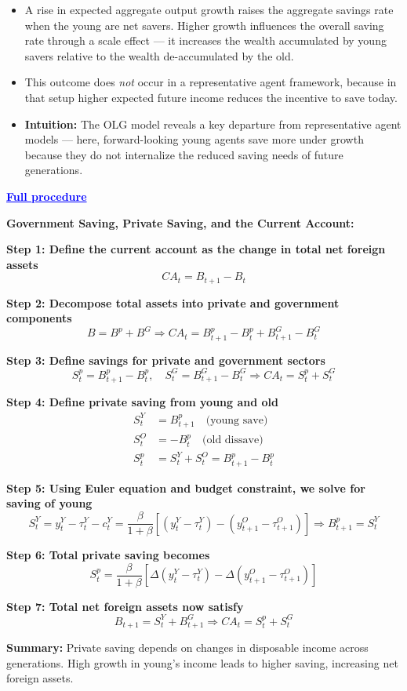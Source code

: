 \documentclass[12pt]{article}
\begin{document}
\begin{itemize}
  \item A rise in expected aggregate output growth raises the aggregate savings rate when the young are net savers. Higher growth influences the overall saving rate through a scale effect — it increases the wealth accumulated by young savers relative to the wealth de-accumulated by the old.

  \item This outcome does \textit{not} occur in a representative agent framework, because in that setup higher expected future income reduces the incentive to save today.
  
  \item \textbf{Intuition:} The OLG model reveals a key departure from representative agent models — here, forward-looking young agents save more under growth because they do not internalize the reduced saving needs of future generations.
\end{itemize}

\textcolor{blue}{\textbf{\uline{Full procedure}}}

{\color{blue}
\textbf{Government Saving, Private Saving, and the Current Account:}

\textbf{Step 1: Define the current account as the change in total net foreign assets}
\[
CA_t = B_{t+1} - B_t
\]

\textbf{Step 2: Decompose total assets into private and government components}
\[
B = B^p + B^G \Rightarrow CA_t = B^p_{t+1} - B^p_t + B^G_{t+1} - B^G_t
\]

\textbf{Step 3: Define savings for private and government sectors}
\[
S^p_t = B^p_{t+1} - B^p_t, \quad S^G_t = B^G_{t+1} - B^G_t
\Rightarrow CA_t = S^p_t + S^G_t
\]

\textbf{Step 4: Define private saving from young and old}
\begin{align*}
S^Y_t &= B^p_{t+1} \quad \text{(young save)} \\
S^O_t &= -B^p_t \quad \text{(old dissave)} \\
S^p_t &= S^Y_t + S^O_t = B^p_{t+1} - B^p_t
\end{align*}

\textbf{Step 5: Using Euler equation and budget constraint, we solve for saving of young}
\[
S^Y_t = y^Y_t - \tau^Y_t - c^Y_t = \frac{\beta}{1+\beta} \left[ (y^Y_t - \tau^Y_t) - (y^O_{t+1} - \tau^O_{t+1}) \right]
\Rightarrow B^p_{t+1} = S^Y_t
\]

\textbf{Step 6: Total private saving becomes}
\[
S^p_t = \frac{\beta}{1+\beta} \left[ \Delta(y^Y_t - \tau^Y_t) - \Delta(y^O_{t+1} - \tau^O_{t+1}) \right]
\]

\textbf{Step 7: Total net foreign assets now satisfy}
\[
B_{t+1} = S^Y_t + B^G_{t+1}
\Rightarrow CA_t = S^p_t + S^G_t
\]

\textbf{Summary:} Private saving depends on changes in disposable income across generations. High growth in young's income leads to higher saving, increasing net foreign assets.
}
\end{document}
